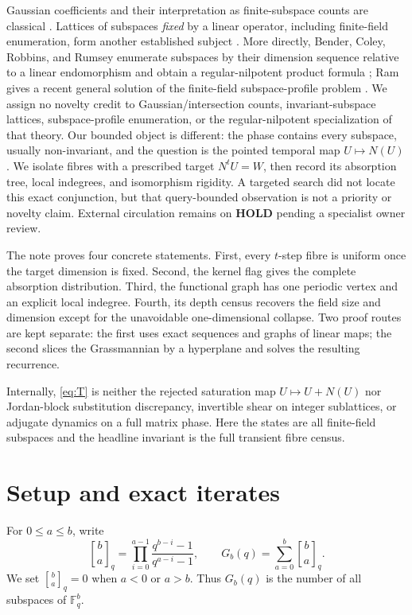 \documentclass[11pt,a4paper]{amsart}
\newcommand{\F}{\mathbb F}
\newcommand{\qbinom}[2]{\genfrac{[}{]}{0pt}{}{#1}{#2}_{q}}
\begin{document}
Gaussian coefficients and their interpretation as finite-subspace counts
are classical \citep{GoldmanRota1970,Prasad2010}.  Lattices of subspaces
\emph{fixed} by a linear operator, including finite-field enumeration, form
another established subject
\citep{BrickmanFillmore1967,Fripertinger2011}.  More directly, Bender,
Coley, Robbins, and Rumsey enumerate subspaces by their dimension sequence
relative to a linear endomorphism and obtain a regular-nilpotent product
formula \citep{BenderEtAl1992}; Ram gives a recent general solution of the
finite-field subspace-profile problem \citep{Ram2026}.  We assign no novelty
credit to Gaussian/intersection counts, invariant-subspace lattices,
subspace-profile enumeration, or the regular-nilpotent specialization of
that theory.  Our bounded object is different: the phase contains every
subspace, usually non-invariant, and the question is the pointed temporal map
$U\mapsto N(U)$.  We isolate fibres with a prescribed target $N^tU=W$, then
record its absorption tree, local indegrees, and isomorphism rigidity.  A
targeted search did not locate this exact conjunction, but that query-bounded
observation is not a priority or novelty claim.  External circulation remains
on \textbf{HOLD} pending a specialist owner review.

The note proves four concrete statements.  First, every $t$-step fibre is
uniform once the target dimension is fixed.  Second, the kernel flag gives
the complete absorption distribution.  Third, the functional graph has one
periodic vertex and an explicit local indegree.  Fourth, its depth census
recovers the field size and dimension except for the unavoidable
one-dimensional collapse.  Two proof routes are kept separate: the first
uses exact sequences and graphs of linear maps; the second slices the
Grassmannian by a hyperplane and solves the resulting recurrence.

Internally, \eqref{eq:T} is neither the rejected saturation map
$U\mapsto U+N(U)$ nor Jordan-block substitution discrepancy, invertible
shear on integer sublattices, or adjugate dynamics on a full matrix phase.
Here the states are all finite-field subspaces and the headline invariant is
the full transient fibre census.

\section{Setup and exact iterates}

For $0\leq a\leq b$, write
\[
 \qbinom{b}{a}
 =\prod_{i=0}^{a-1}\frac{q^{b-i}-1}{q^{a-i}-1},
 \qquad
 G_b(q)=\sum_{a=0}^{b}\qbinom{b}{a}.
\]
We set $\qbinom{b}{a}=0$ when $a<0$ or $a>b$.  Thus $G_b(q)$ is the number
of all subspaces of $\F_q^b$.
\end{document}
